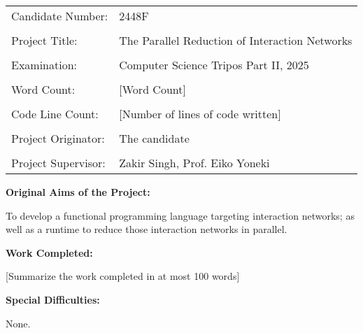 \documentclass[12pt,a4paper]{report}
\begin{document}
\begin{tabular}{ll}
Candidate Number: & 2448F \\
\\
Project Title: & The Parallel Reduction of Interaction Networks \\
\\
Examination: & Computer Science Tripos Part II, 2025 \\
\\
Word Count: & [Word Count] \\
\\
Code Line Count: & [Number of lines of code written] \\
\\
Project Originator: & The candidate \\
\\
Project Supervisor: & Zakir Singh, Prof. Eiko Yoneki \\
\end{tabular}

\vspace{1cm}
\textbf{Original Aims of the Project:}

To develop a functional programming language targeting interaction networks; as well as a runtime to reduce those interaction networks in parallel.

\vspace{1cm}
\textbf{Work Completed:}

[Summarize the work completed in at most 100 words]

\vspace{1cm}
\textbf{Special Difficulties:}

None.

\newpage

\tableofcontents
\newpage




% 
% 


\nocite{*}


\end{document}
